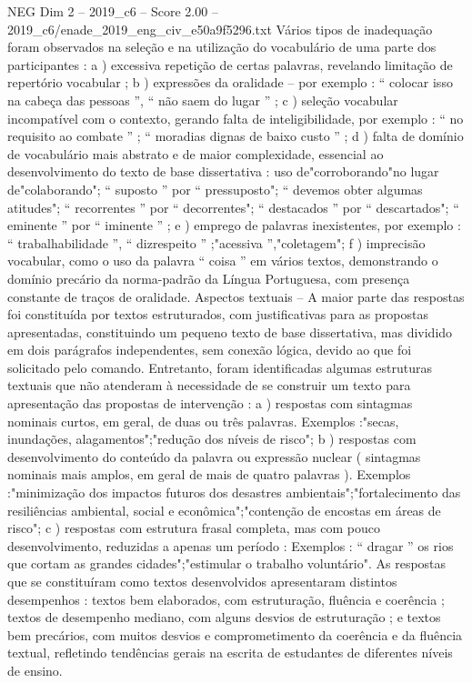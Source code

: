 \begin{textsample}{NEG Dim 2 – 2019\_c6 – Score 2.00 – 2019\_c6/enade\_2019\_eng\_civ\_e50a9f5296.txt}
Vários tipos de inadequação foram observados na seleção e na utilização do vocabulário de uma parte dos participantes : a ) excessiva repetição de certas palavras, revelando limitação de repertório vocabular ; b ) expressões da oralidade – por exemplo : “ colocar isso na cabeça das pessoas ”, “ não saem do lugar ” ; c ) seleção vocabular incompatível com o contexto, gerando falta de inteligibilidade, por exemplo : “ no requisito ao combate ” ; “ moradias dignas de baixo custo ” ; d ) falta de domínio de vocabulário mais abstrato e de maior complexidade, essencial ao desenvolvimento do texto de base dissertativa : uso de"corroborando"no lugar de"colaborando"; “ suposto ” por “ pressuposto"; “ devemos obter algumas atitudes"; “ recorrentes ” por “ decorrentes"; “ destacados ” por “ descartados"; “ eminente ” por “ iminente ” ; e ) emprego de palavras inexistentes, por exemplo : “ trabalhabilidade ”, “ dizrespeito ” ;"acessiva ”,"coletagem"; f ) imprecisão vocabular, como o uso da palavra “ coisa ” em vários textos, demonstrando o domínio precário da norma-padrão da Língua Portuguesa, com presença constante de traços de oralidade.
Aspectos textuais – A maior parte das respostas foi constituída por textos estruturados, com justificativas para as propostas apresentadas, constituindo um pequeno texto de base dissertativa, mas dividido em dois parágrafos independentes, sem conexão lógica, devido ao que foi solicitado pelo comando.
Entretanto, foram identificadas algumas estruturas textuais que não atenderam à necessidade de se construir um texto para apresentação das propostas de intervenção : a ) respostas com sintagmas nominais curtos, em geral, de duas ou três palavras.
Exemplos :"secas, inundações, alagamentos";"redução dos níveis de risco"; b ) respostas com desenvolvimento do conteúdo da palavra ou expressão nuclear ( sintagmas nominais mais amplos, em geral de mais de quatro palavras ).
Exemplos :"minimização dos impactos futuros dos desastres ambientais";"fortalecimento das resiliências ambiental, social e econômica";"contenção de encostas em áreas de risco"; c ) respostas com estrutura frasal completa, mas com pouco desenvolvimento, reduzidas a apenas um período : Exemplos : “ dragar ” os rios que cortam as grandes cidades";"estimular o trabalho voluntário".
As respostas que se constituíram como textos desenvolvidos apresentaram distintos desempenhos : textos bem elaborados, com estruturação, fluência e coerência ; textos de desempenho mediano, com alguns desvios de estruturação ; e textos bem precários, com muitos desvios e comprometimento da coerência e da fluência textual, refletindo tendências gerais na escrita de estudantes de diferentes níveis de ensino.

\end{textsample}
